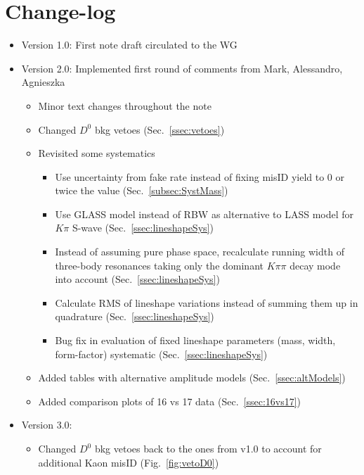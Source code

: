 
\section*{Change-log}
\label{sec:change}


\begin{itemize}
	\item Version 1.0: First note draft circulated to the WG
	
	\item Version 2.0: Implemented first round of comments from Mark, Alessandro, Agnieszka
	\begin{itemize}
		\item Minor text changes throughout the note
		\item Changed $D^0$ bkg vetoes (Sec.~\ref{ssec:vetoes}) 
		\item Revisited some systematics
			\begin{itemize}
				\item Use uncertainty from fake rate instead of fixing misID yield to 0 or twice the value (Sec.~\ref{subsec:SystMass})
				\item Use GLASS model instead of RBW as alternative to LASS model for $K\pi$ S-wave (Sec.~\ref{ssec:lineshapeSys}) 
				\item Instead of assuming pure phase space, 
					recalculate running width of three-body resonances taking only the dominant $K\pi\pi$ decay mode into account (Sec.~\ref{ssec:lineshapeSys}) 
				\item Calculate RMS of lineshape variations instead of summing them up in quadrature (Sec.~\ref{ssec:lineshapeSys}) 
				\item Bug fix in evaluation of fixed lineshape parameters (mass, width, form-factor) systematic (Sec.~\ref{ssec:lineshapeSys}) 
			\end{itemize}
		\item Added tables with alternative amplitude models (Sec.~\ref{ssec:altModels}) 
		\item Added comparison plots of 16 vs 17 data (Sec.~\ref{ssec:16vs17}) 
	\end{itemize}
	
	\item Version 3.0: 
	\begin{itemize}
	
		\item Changed $D^0$ bkg vetoes back to the ones from v1.0 to account for additional Kaon misID (Fig.~\ref{fig:vetoD0}) 		


\end{itemize}
\end{itemize}
